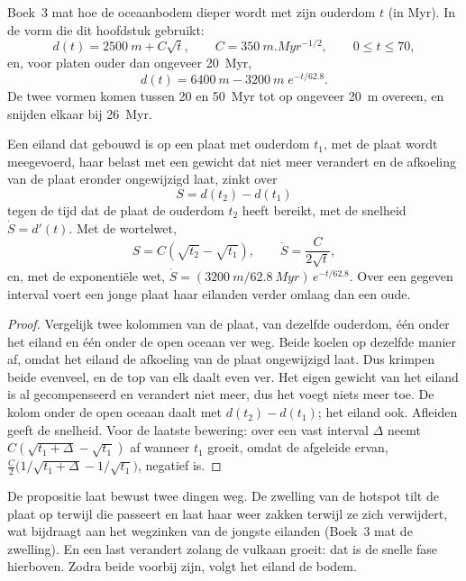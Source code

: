 Boek~3 mat hoe de oceaanbodem dieper wordt met zijn ouderdom $t$ (in \unit{Myr}). In de
vorm die dit hoofdstuk gebruikt:
\[
d(t) = \qty{2500}{m} + C\sqrt{t}, \qquad C = \qty{350}{m.Myr^{-1/2}}, \qquad 0 \le t \le 70,
\]
en, voor platen ouder dan ongeveer \qty{20}{Myr},
\[
d(t) = \qty{6400}{m} - \qty{3200}{m}\; e^{-t/62.8}.
\]
De twee vormen komen tussen 20 en \qty{50}{Myr} tot op ongeveer \qty{20}{m} overeen, en snijden elkaar bij
\qty{26}{Myr}.

\begin{proposition}\label{prop:b2:oceanic-islands:sinking}
Een eiland dat gebouwd is op een plaat met ouderdom $t_1$, met de plaat wordt meegevoerd, haar belast met een gewicht dat
niet meer verandert en de afkoeling van de plaat eronder ongewijzigd laat, zinkt over
\[
S = d(t_2) - d(t_1)
\]
tegen de tijd dat de plaat de ouderdom $t_2$ heeft bereikt, met de snelheid $\dot S = d'(t)$. Met de wortelwet,
\[
S = C\left(\sqrt{t_2} - \sqrt{t_1}\right), \qquad \dot S = \frac{C}{2\sqrt t},
\]
en, met de exponentiële wet, $\dot S = (\qty{3200}{m}/\qty{62.8}{Myr})\,e^{-t/62.8}$. Over een
gegeven interval voert een jonge plaat haar eilanden verder omlaag dan een oude.
\end{proposition}

\begin{proof}
Vergelijk twee kolommen van de plaat, van dezelfde ouderdom, één onder het eiland en één onder de open
oceaan ver weg. Beide koelen op dezelfde manier af, omdat het eiland de afkoeling van de plaat ongewijzigd laat. Dus krimpen beide evenveel, en de top van elk daalt even
ver. Het eigen gewicht van het eiland is al gecompenseerd en verandert niet meer, dus het voegt niets
meer toe. De kolom onder de open oceaan daalt met $d(t_2) - d(t_1)$; het eiland ook. Afleiden
geeft de snelheid. Voor de laatste bewering: over een vast interval $\Delta$ neemt $C(\sqrt{t_1 + \Delta} -
\sqrt{t_1})$ af wanneer $t_1$ groeit, omdat de afgeleide ervan, $\frac C2\bigl(1/\sqrt{t_1 + \Delta}
- 1/\sqrt{t_1}\bigr)$, negatief is.
\end{proof}

De propositie laat bewust twee dingen weg. De zwelling van de hotspot tilt de plaat op terwijl die
passeert en laat haar weer zakken terwijl ze zich verwijdert, wat bijdraagt aan het wegzinken van de jongste eilanden
(Boek~3 mat de zwelling). En een last verandert zolang de vulkaan groeit: dat is de
snelle fase hierboven. Zodra beide voorbij zijn, volgt het eiland de bodem.

